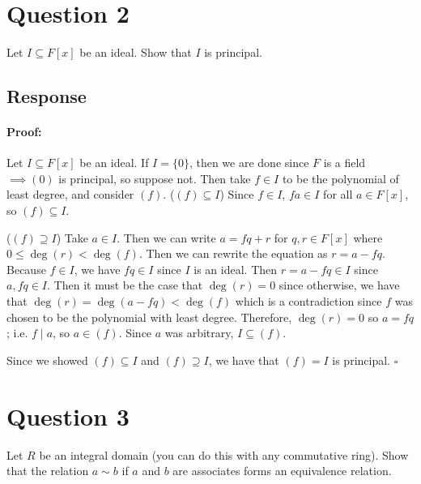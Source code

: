 \documentclass [12pt] {article}
\newenvironment{proof}{\paragraph{Proof:}}{\hfill$\square$}
\begin{document}
\section*{Question 2}
Let $I\subseteq F[x]$ be an ideal. Show that $I$ is principal.

\subsection*{Response}
\begin{proof}
    Let $I \subseteq F[x]$ be an ideal. If $I = \{ 0 \}$, then we are done since $F$ is a field
    $\implies (0)$ is principal, so suppose not. Then take $f \in I$ to be the polynomial of least
    degree, and consider $(f)$.
    \newline
    ($(f) \subseteq I$)
    Since $f \in I$, $fa \in I$ for all $a \in F[x]$, so $(f) \subseteq I$.
    \vspace{1em}

    ($(f) \supseteq I$)
    Take $a \in I$. Then we can write $a = fq + r$ for $q, r \in F[x]$ where
    $0 \leq \deg(r) < \deg(f)$. Then we can rewrite the equation as $r = a - fq$. Because $f \in I$,
    we have $fq \in I$ since $I$ is an ideal. Then $r = a - fq \in I$ since $a, fq \in I$. Then
    it must be the case that $\deg(r) = 0$ since otherwise, we have that
    $\deg(r) = \deg(a - fq) < \deg(f)$ which is a contradiction since $f$ was chosen to be the
    polynomial with least degree. Therefore, $\deg(r) = 0$ so $a = fq$; i.e. $f \mid a$, so
    $a \in (f)$. Since $a$ was arbitrary, $I \subseteq (f)$.
    \vspace{1em}

    Since we showed $(f) \subseteq I$ and $(f) \supseteq I$, we have that $(f) = I$ is principal.
\end{proof}
\newpage


\section*{Question 3}
Let $R$ be an integral domain (you can do this with any commutative ring). Show that the relation
$a\sim b$ if $a$ and $b$ are associates forms an equivalence relation.
\end{document}
